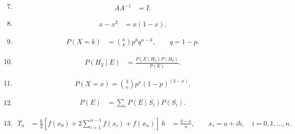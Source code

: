 \begin{enumerate}[label=\thesubsection.\arabic*, ref=\thesubsection.\theenumi, leftmargin=12mm, itemsep=4pt]
    \setcounter{enumi}{6}
    \item[\ref{question-short:C12-Q30}]
    \begin{align}
        AA^{-1} &= I.
        \label{formula:C12-Q30}
    \end{align}


    \setcounter{enumi}{8}
    \item[\ref{question-short:C12-Q52}]
    \begin{align}
        x-x^2 &= x(1-x).
        \label{formula:C12-Q52}
    \end{align}

    \setcounter{enumi}{9}
    \item[\ref{question-short:C12-Q53}]
    \begin{align}
        P(X=k) &= \binom{n}{k}p^kq^{n-k},
        \qquad q=1-p.
        \label{formula:C12-Q53}
    \end{align}

    \setcounter{enumi}{10}
    \item[\ref{question-short:C12-Q54}]
    \begin{align}
        P(H_2\mid E) &= \frac{P(E\mid H_2)P(H_2)}{P(E)}.
        \label{formula:C12-Q54}
    \end{align}

    \setcounter{enumi}{11}
    \item[\ref{question-short:C12-Q56}]
    \begin{align}
	    P(X=x)=\binom3xp^x(1-p)^{(3-x)}.
        \label{formula:C12-Q56}
    \end{align}

    \setcounter{enumi}{12}
    \item[\ref{question-short:C12-Q57}]
    \begin{align}
        P(E) &= \sum_iP(E\mid S_i)P(S_i).
        \label{formula:C12-Q57}
    \end{align}

    \setcounter{enumi}{14}
    \item[\ref{question-short:C12-Q58}]
	    \begin{align}
		    T_n &= \frac{h}{2}\left[
f(x_0)+2\sum_{i=1}^{n-1}f(x_i)+f(x_n)
\right]\
h &= \frac{b-a}{n}, \qquad x_i=a+ih,
\quad i=0,1,\ldots,n.
	    \label{formula:C12-Q58}
    \end{align}
\end{enumerate}
